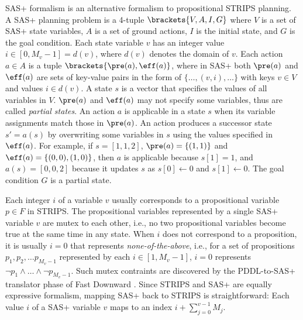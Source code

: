 SAS+ formalism \cite{backstrom1995complexity} is an alternative formalism to propositional STRIPS planning.
A SAS+ planning problem is a 4-tuple $\brackets{V,A,I,G}$
where
$V$ is a set of SAS+ state variables,
$A$ is a set of ground actions,
$I$ is the initial state,
and
$G$ is the goal condition.
% 
Each state variable $v$ has an integer value $i\in [0, M_v-1]=d(v)$,
where $d(v)$ denotes the domain of $v$.
% 
Each action $a\in A$ is a tuple $\brackets{\pre(a), \eff(a)}$,
where in SAS+
both $\pre(a)$ and $\eff(a)$ are sets of key-value pairs
in the form of $\{\ldots, (v,i), \ldots\}$ with keys $v\in V$ and values $i\in d(v)$.
% 
A state $s$ is a vector that specifies the values of all variables in $V$.
$\pre(a)$ and $\eff(a)$ may not specify some variables, thus are called \emph{partial states}.
An action $a$ is applicable in a state $s$ when its variable assignments match those in $\pre(a)$.
An action produces a successor state $s'=a(s)$
by overwriting some variables in $s$ using the values specified in $\eff(a)$.
For example,
if $s=[1,1,2]$, $\pre(a)=\{(1,1)\}$ and $\eff(a)=\{(0,0),(1,0)\}$, then
$a$ is applicable because $s[1]=1$, and $a(s)=[0,0,2]$ because it updates $s$ as $s[0]\gets 0$ and $s[1]\gets 0$.
% 
% 
The goal condition $G$ is a partial state.

Each integer $i$ of a variable $v$ usually corresponds to a propositional variable $p\in F$ in STRIPS.
The propositional variables represented by a single SAS+ variable $v$
are mutex to each other, i.e., no two propositional variables become true at the same time in any state.
When $i$ does not correspond to a proposition,
it is usually $i=0$ that represents \emph{none-of-the-above}, i.e.,
for a set of propositions $p_1, p_2, \ldots p_{M_v-1}$ represented by each $i\in [1, M_v-1]$,
$i=0$ represents $\lnot p_1\land \ldots \land \lnot p_{M_v-1}$.
Such mutex contraints are discovered by the PDDL-to-SAS+ translator phase of Fast Downward \cite{}.
% 
Since STRIPS and SAS+ are equally expressive formalism, mapping SAS+ back to STRIPS is straightforward:
Each value $i$ of a SAS+ variable $v$ maps to an index $i+\sum_{j=0}^{v-1}M_j$.
